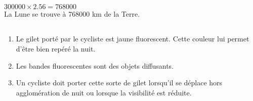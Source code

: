 \documentclass[12pt,a4paper]{article}
\begin{document}
\subsection*{}

$\num{300000} \times \num{2.56} = \num{768000}$\\
La Lune se trouve à \num{768000} km de la Terre.

\subsection*{}
\begin{enumerate}[label=\alph*)]
	\item Le gilet porté par le cycliste est jaune fluorescent. Cette couleur lui permet d'être bien repéré la nuit.
	\item Les bandes fluorescentes sont des objets diffusants.
	\item Un cycliste doit porter cette sorte de gilet lorsqu'il se déplace hors agglomération de nuit ou lorsque la visibilité est réduite.
\end{enumerate}
\end{document}

